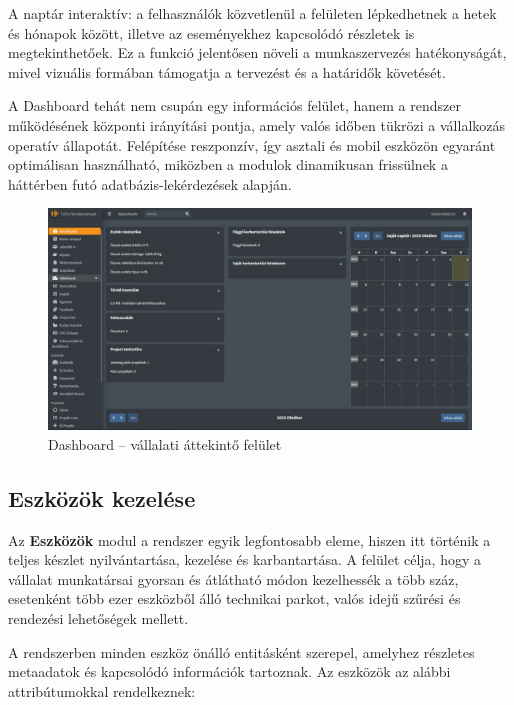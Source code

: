 A naptár interaktív: a felhasználók közvetlenül a felületen lépkedhetnek a hetek és hónapok között, 
illetve az eseményekhez kapcsolódó részletek is megtekinthetőek.  
Ez a funkció jelentősen növeli a munkaszervezés hatékonyságát, mivel vizuális formában támogatja a tervezést és a határidők követését.

A Dashboard tehát nem csupán egy információs felület, hanem a rendszer működésének központi irányítási pontja, 
amely valós időben tükrözi a vállalkozás operatív állapotát.  
Felépítése reszponzív, így asztali és mobil eszközön egyaránt optimálisan használható, 
miközben a modulok dinamikusan frissülnek a háttérben futó adatbázis-lekérdezések alapján.

\begin{figure}[H]
	\centering
    \includegraphics[width=150mm, keepaspectratio]{figures/dashboard.jpg}
    \caption{Dashboard – vállalati áttekintő felület}
    \label{fig:dashboard}
\end{figure}

\subsection{Eszközök kezelése}

Az \textbf{Eszközök} modul a rendszer egyik legfontosabb eleme, hiszen itt történik a teljes készlet nyilvántartása, kezelése és karbantartása.  
A felület célja, hogy a vállalat munkatársai gyorsan és átlátható módon kezelhessék a több száz, esetenként több ezer eszközből álló technikai parkot, 
valós idejű szűrési és rendezési lehetőségek mellett.

A rendszerben minden eszköz önálló entitásként szerepel, amelyhez részletes metaadatok és kapcsolódó információk tartoznak.  
Az eszközök az alábbi attribútumokkal rendelkeznek:

